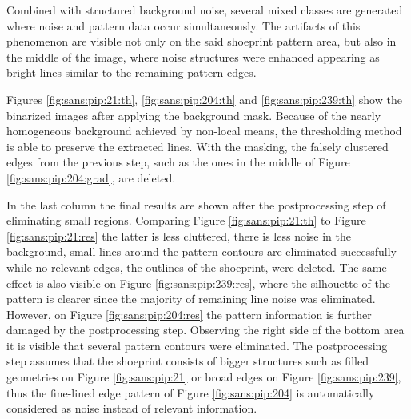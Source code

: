 \documentclass[draft,final]{vutinfth} %
\begin{document}
Combined with structured background noise, several mixed classes are generated where noise and pattern data occur simultaneously.
The artifacts of this phenomenon are visible not only on the said shoeprint pattern area, but also in the middle of the image, where noise structures were enhanced appearing as bright lines similar to the remaining pattern edges.
\par
Figures \ref{fig:sans:pip:21:th}, \ref{fig:sans:pip:204:th} and \ref{fig:sans:pip:239:th} show the binarized images after applying the background mask.
Because of the nearly homogeneous background achieved by non-local means, the thresholding method is able to preserve the extracted lines.
With the masking, the falsely clustered edges from the previous step, such as the ones in the middle of Figure \ref{fig:sans:pip:204:grad}, are deleted.
\par
In the last column the final results are shown after the postprocessing step of eliminating small regions.
Comparing Figure \ref{fig:sans:pip:21:th} to  Figure \ref{fig:sans:pip:21:res} the latter is less cluttered, there is less noise in the background, small lines around the pattern contours are eliminated successfully while no relevant edges, the outlines of the shoeprint, were deleted.
The same effect is also visible on Figure \ref{fig:sans:pip:239:res}, where the silhouette of the pattern is clearer since the majority of remaining line noise was eliminated.
However, on Figure \ref{fig:sans:pip:204:res} the pattern information is further damaged by the postprocessing step.
Observing the right side of the bottom area it is visible that several pattern contours were eliminated.
The postprocessing step assumes that the shoeprint consists of bigger structures such as filled geometries on Figure \ref{fig:sans:pip:21} or broad edges on Figure \ref{fig:sans:pip:239}, thus the fine-lined edge pattern of Figure \ref{fig:sans:pip:204} is automatically considered as noise instead of relevant information.
\end{document}
